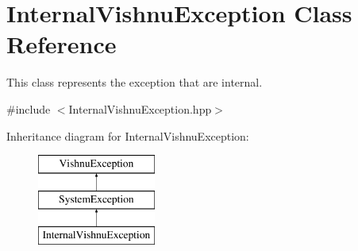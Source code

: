 \hypertarget{classInternalVishnuException}{
\section{InternalVishnuException Class Reference}
\label{classInternalVishnuException}
}


This class represents the exception that are internal.  




{\ttfamily \#include $<$InternalVishnuException.hpp$>$}

Inheritance diagram for InternalVishnuException:\begin{figure}[H]
\begin{center}
\leavevmode
\includegraphics[height=3.000000cm]{classInternalVishnuException}
\end{center}
\end{figure}
